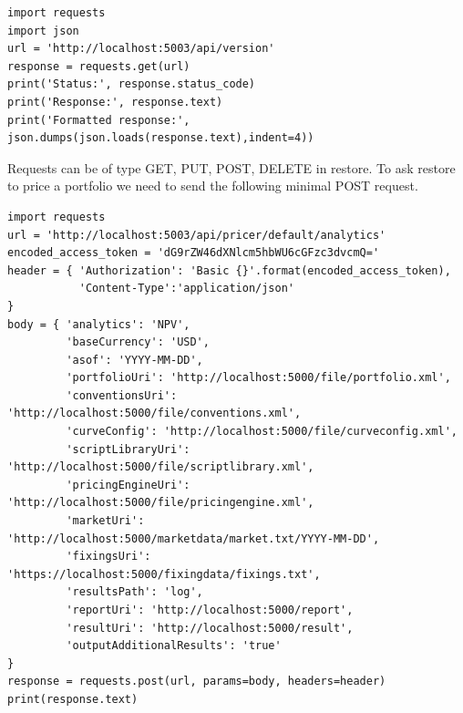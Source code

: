 \documentclass[12pt, a4paper]{report}
\begin{document}
\begin{verbatim}
import requests
import json
url = 'http://localhost:5003/api/version'
response = requests.get(url)
print('Status:', response.status_code)
print('Response:', response.text)
print('Formatted response:', json.dumps(json.loads(response.text),indent=4))
\end{verbatim}

Requests can be of type GET, PUT, POST, DELETE in restore.
To ask restore to price a portfolio we need to send the following minimal POST request.

\begin{verbatim}
import requests
url = 'http://localhost:5003/api/pricer/default/analytics'
encoded_access_token = 'dG9rZW46dXNlcm5hbWU6cGFzc3dvcmQ='
header = { 'Authorization': 'Basic {}'.format(encoded_access_token),
           'Content-Type':'application/json'
}
body = { 'analytics': 'NPV',
         'baseCurrency': 'USD',
         'asof': 'YYYY-MM-DD',
         'portfolioUri': 'http://localhost:5000/file/portfolio.xml',
         'conventionsUri': 'http://localhost:5000/file/conventions.xml',
         'curveConfig': 'http://localhost:5000/file/curveconfig.xml',
         'scriptLibraryUri': 'http://localhost:5000/file/scriptlibrary.xml',
         'pricingEngineUri': 'http://localhost:5000/file/pricingengine.xml',
         'marketUri': 'http://localhost:5000/marketdata/market.txt/YYYY-MM-DD',
         'fixingsUri': 'https://localhost:5000/fixingdata/fixings.txt',
         'resultsPath': 'log',
         'reportUri': 'http://localhost:5000/report',
         'resultUri': 'http://localhost:5000/result',
         'outputAdditionalResults': 'true'
}
response = requests.post(url, params=body, headers=header)
print(response.text)
\end{verbatim}
\end{document}
